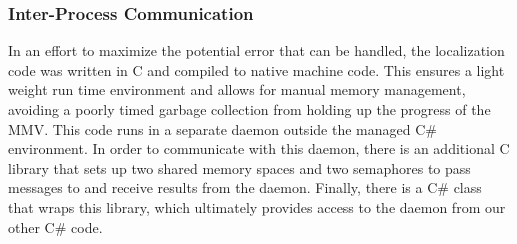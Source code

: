 \subsubsection{Inter-Process Communication}
In an effort to maximize the potential error that can be handled, the localization code was written in C and compiled to native machine code.  This ensures a light weight run time environment and allows for manual memory management, avoiding a poorly timed garbage collection from holding up the progress of the MMV.  This code runs in a separate daemon outside the managed C\# environment.  In order to communicate with this daemon, there is an additional C library that sets up two shared memory spaces and two semaphores to pass messages to and receive results from the daemon.  Finally, there is a C\# class that wraps this library, which ultimately provides access to the daemon from our other C\# code.
